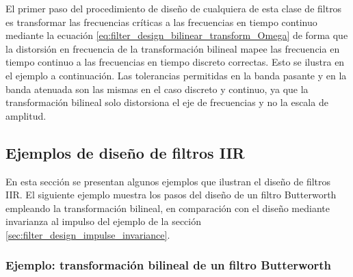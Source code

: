 \documentclass[a4paper]{report}
\begin{document}
El primer paso del procedimiento de diseño de cualquiera de esta clase de filtros es transformar las frecuencias críticas a las frecuencias en tiempo continuo mediante la ecuación \ref{eq:filter_design_bilinear_transform_Omega} de forma que la distorsión en frecuencia de la transformación bilineal mapee las frecuencia en tiempo continuo a las frecuencias en tiempo discreto correctas. Esto se ilustra en el ejemplo a continuación. Las tolerancias permitidas en la banda pasante y en la banda atenuada son las mismas en el caso discreto y continuo, ya que la transformación bilineal solo distorsiona el eje de frecuencias y no la escala de amplitud.

\subsection{Ejemplos de diseño de filtros IIR}\label{sec:filter_design_iir_examples}

En esta sección se presentan algunos ejemplos que ilustran el diseño de filtros IIR. El siguiente ejemplo muestra los pasos del diseño de un filtro Butterworth empleando la transformación bilineal, en comparación con el diseño mediante invarianza al impulso del ejemplo de la sección \ref{sec:filter_design_impulse_invariance}.

\subsubsection{Ejemplo: transformación bilineal de un filtro Butterworth}
\end{document}
